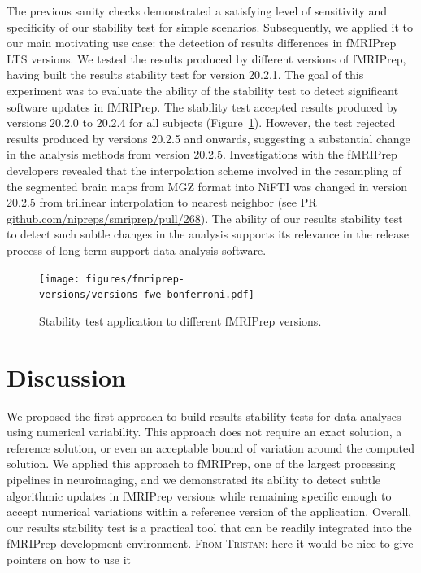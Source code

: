 \documentclass[lettersize,journal]{IEEEtran}
\newcommand{\TG}[1]{\color{orange}\textsc{From Tristan:} #1\color{black}\xspace}
\newcommand{\fmriprep}{fMRIPrep\xspace}
\begin{document}
The previous sanity checks demonstrated a satisfying level of sensitivity and specificity of our stability test for simple scenarios. Subsequently, we applied it to our main motivating use case: the detection of results differences in \fmriprep LTS versions. We tested the results produced by different versions of \fmriprep, having built the results stability test for version 20.2.1. The goal of this experiment was to evaluate the ability of the stability test to detect significant software updates in \fmriprep. The stability test accepted results produced by versions 20.2.0 to 20.2.4 for all subjects (Figure~\ref{fig:version_bonferroni}). However, the test rejected results produced by versions 20.2.5 and onwards, suggesting a substantial change in the analysis methods from version 20.2.5. Investigations with the \fmriprep developers revealed that the interpolation scheme involved in the resampling of the segmented brain maps from MGZ format into NiFTI was changed in version {20.2.5} from trilinear interpolation to nearest neighbor (see PR \href{https://github.com/nipreps/smriprep/pull/268}{\url{github.com/nipreps/smriprep/pull/268}}). The ability of our results stability test to detect such subtle changes in the analysis supports its relevance in the release process of long-term support data analysis software.

\begin{figure}
  \centering
  \texttt{[image: figures/fmriprep-versions/versions\_fwe\_bonferroni.pdf]}
  \caption{Stability test application to different \fmriprep versions.}
  \label{fig:version_bonferroni}
\end{figure}


\section{Discussion}


We proposed the first approach to build results stability tests for data analyses using numerical variability. This approach does not require an exact solution, a reference solution, or even an acceptable bound of variation around the computed solution. We applied this approach to \fmriprep, one of the largest processing pipelines in neuroimaging, and we demonstrated its ability to detect subtle algorithmic updates in \fmriprep versions while remaining specific enough to accept numerical variations within a reference version of the application. Overall, our results stability test is a practical tool that can be readily integrated into the \fmriprep development environment. \TG{here it would be nice to give pointers on how to use it}
\end{document}
